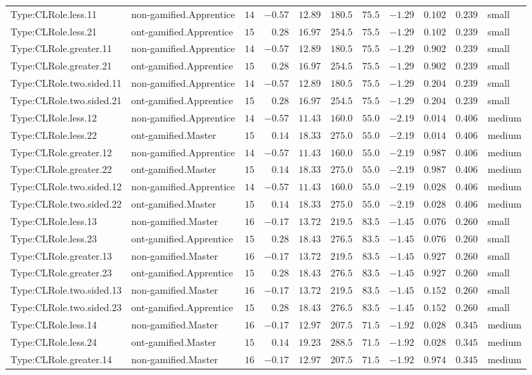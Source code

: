 \documentclass[6pt,a4paper]{article}
\begin{document}
{\begin{longtable}{llrrrrrrrrl}
Type:CLRole.less.11&non-gamified.Apprentice&$14$&$-0.57$&$12.89$&$ 180.5$&$ 75.5$&$-1.29$&$0.102$&$0.239$&small\tabularnewline
Type:CLRole.less.21&ont-gamified.Apprentice&$15$&$ 0.28$&$16.97$&$ 254.5$&$ 75.5$&$-1.29$&$0.102$&$0.239$&small\tabularnewline
Type:CLRole.greater.11&non-gamified.Apprentice&$14$&$-0.57$&$12.89$&$ 180.5$&$ 75.5$&$-1.29$&$0.902$&$0.239$&small\tabularnewline
Type:CLRole.greater.21&ont-gamified.Apprentice&$15$&$ 0.28$&$16.97$&$ 254.5$&$ 75.5$&$-1.29$&$0.902$&$0.239$&small\tabularnewline
Type:CLRole.two.sided.11&non-gamified.Apprentice&$14$&$-0.57$&$12.89$&$ 180.5$&$ 75.5$&$-1.29$&$0.204$&$0.239$&small\tabularnewline
Type:CLRole.two.sided.21&ont-gamified.Apprentice&$15$&$ 0.28$&$16.97$&$ 254.5$&$ 75.5$&$-1.29$&$0.204$&$0.239$&small\tabularnewline
Type:CLRole.less.12&non-gamified.Apprentice&$14$&$-0.57$&$11.43$&$ 160.0$&$ 55.0$&$-2.19$&$0.014$&$0.406$&medium\tabularnewline
Type:CLRole.less.22&ont-gamified.Master&$15$&$ 0.14$&$18.33$&$ 275.0$&$ 55.0$&$-2.19$&$0.014$&$0.406$&medium\tabularnewline
Type:CLRole.greater.12&non-gamified.Apprentice&$14$&$-0.57$&$11.43$&$ 160.0$&$ 55.0$&$-2.19$&$0.987$&$0.406$&medium\tabularnewline
Type:CLRole.greater.22&ont-gamified.Master&$15$&$ 0.14$&$18.33$&$ 275.0$&$ 55.0$&$-2.19$&$0.987$&$0.406$&medium\tabularnewline
Type:CLRole.two.sided.12&non-gamified.Apprentice&$14$&$-0.57$&$11.43$&$ 160.0$&$ 55.0$&$-2.19$&$0.028$&$0.406$&medium\tabularnewline
Type:CLRole.two.sided.22&ont-gamified.Master&$15$&$ 0.14$&$18.33$&$ 275.0$&$ 55.0$&$-2.19$&$0.028$&$0.406$&medium\tabularnewline
Type:CLRole.less.13&non-gamified.Master&$16$&$-0.17$&$13.72$&$ 219.5$&$ 83.5$&$-1.45$&$0.076$&$0.260$&small\tabularnewline
Type:CLRole.less.23&ont-gamified.Apprentice&$15$&$ 0.28$&$18.43$&$ 276.5$&$ 83.5$&$-1.45$&$0.076$&$0.260$&small\tabularnewline
Type:CLRole.greater.13&non-gamified.Master&$16$&$-0.17$&$13.72$&$ 219.5$&$ 83.5$&$-1.45$&$0.927$&$0.260$&small\tabularnewline
Type:CLRole.greater.23&ont-gamified.Apprentice&$15$&$ 0.28$&$18.43$&$ 276.5$&$ 83.5$&$-1.45$&$0.927$&$0.260$&small\tabularnewline
Type:CLRole.two.sided.13&non-gamified.Master&$16$&$-0.17$&$13.72$&$ 219.5$&$ 83.5$&$-1.45$&$0.152$&$0.260$&small\tabularnewline
Type:CLRole.two.sided.23&ont-gamified.Apprentice&$15$&$ 0.28$&$18.43$&$ 276.5$&$ 83.5$&$-1.45$&$0.152$&$0.260$&small\tabularnewline
Type:CLRole.less.14&non-gamified.Master&$16$&$-0.17$&$12.97$&$ 207.5$&$ 71.5$&$-1.92$&$0.028$&$0.345$&medium\tabularnewline
Type:CLRole.less.24&ont-gamified.Master&$15$&$ 0.14$&$19.23$&$ 288.5$&$ 71.5$&$-1.92$&$0.028$&$0.345$&medium\tabularnewline
Type:CLRole.greater.14&non-gamified.Master&$16$&$-0.17$&$12.97$&$ 207.5$&$ 71.5$&$-1.92$&$0.974$&$0.345$&medium\tabularnewline

\end{longtable}}
\end{document}
